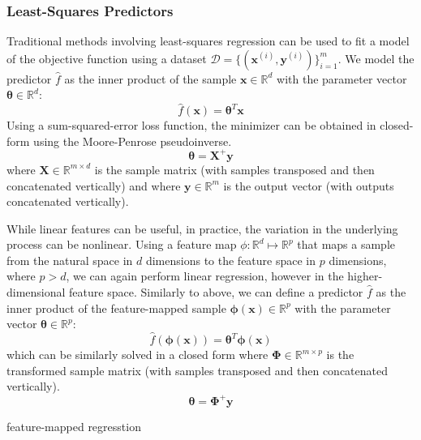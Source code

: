 \documentclass[conference]{IEEEtran}
\begin{document}
    \subsubsection{Least-Squares Predictors}
    
    Traditional methods involving least-squares regression can be used to fit a model of the objective function using a dataset $\mathcal{D} = \{ (\boldsymbol{x}^{(i)}, \boldsymbol{y}^{(i)}) \}_{i=1}^m$. We model the predictor $\hat f$ as the inner product of the sample $\boldsymbol x \in \mathbb{R}^d$ with the parameter vector $\boldsymbol \theta \in \mathbb{R}^d$:
    \begin{equation}
        \hat f(\boldsymbol x) = \boldsymbol \theta ^T \boldsymbol x
    \end{equation}
	Using a sum-squared-error loss function, the minimizer can be obtained in closed-form using the Moore-Penrose pseudoinverse.
	\begin{equation}
	    \boldsymbol{\theta} = \boldsymbol{X}^+ \boldsymbol{y}
	\end{equation}
	where $\boldsymbol X \in \mathbb{R}^{m \times d}$ is the sample matrix (with samples transposed and then concatenated vertically) and where $\boldsymbol y \in \mathbb{R}^m$ is the output vector (with outputs concatenated vertically). 

	While linear features can be useful, in practice, the variation in the underlying process can be nonlinear. Using a feature map $\phi: \mathbb{R}^d \mapsto \mathbb{R}^p$ that maps a sample from the natural space in $d$ dimensions to the feature space in $p$ dimensions, where $p > d$, we can again perform linear regression, however in the higher-dimensional feature space. Similarly to above, we can define a predictor $\hat f$ as the inner product of the feature-mapped sample $\boldsymbol{\phi(x)} \in \mathbb{R}^p$ with the parameter vector $\boldsymbol{\theta} \in \mathbb{R}^p$:
    \begin{equation}
        \hat f(\boldsymbol{\phi(x)}) = \boldsymbol{\theta}^T \boldsymbol{\phi(x)}
    \end{equation}
    which can be similarly solved in a closed form where $\boldsymbol \Phi \in \mathbb{R}^{m \times p}$ is the transformed sample matrix (with samples transposed and then concatenated vertically).
    \begin{equation}
	    \boldsymbol{\theta} = \boldsymbol{\Phi}^+ \boldsymbol{y}
	\end{equation}
	
	feature-mapped regresstion
	
\end{document}
